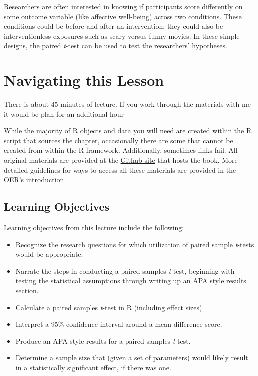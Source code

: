\documentclass[
  11pt,
]{book}
\providecommand{\tightlist}{%
  \setlength{\itemsep}{0pt}\setlength{\parskip}{0pt}}
\begin{document}
Researchers are often interested in knowing if participants score differently on some outcome variable (like affective well-being) across two conditions. These conditions could be before and after an intervention; they could also be interventionless exposures such as scary versus funny movies. In these simple designs, the paired \emph{t}-test can be used to test the researchers' hypotheses.

\hypertarget{navigating-this-lesson-4}{%
\section{Navigating this Lesson}\label{navigating-this-lesson-4}}

There is about 45 minutes of lecture. If you work through the materials with me it would be plan for an additional hour

While the majority of R objects and data you will need are created within the R script that sources the chapter, occasionally there are some that cannot be created from within the R framework. Additionally, sometimes links fail. All original materials are provided at the \href{https://github.com/lhbikos/ReCenterPsychStats}{Github site} that hosts the book. More detailed guidelines for ways to access all these materials are provided in the OER's \protect\hyperlink{ReCintro}{introduction}

\hypertarget{learning-objectives-4}{%
\subsection{Learning Objectives}\label{learning-objectives-4}}

Learning objectives from this lecture include the following:

\begin{itemize}
\tightlist
\item
  Recognize the research questions for which utilization of paired sample \emph{t}-tests would be appropriate.
\item
  Narrate the steps in conducting a paired samples \emph{t}-test, beginning with testing the statistical assumptions through writing up an APA style results section.
\item
  Calculate a paired samples \emph{t}-test in R (including effect sizes).
\item
  Interpret a 95\% confidence interval around a mean difference score.
\item
  Produce an APA style results for a paired-samples \emph{t}-test.
\item
  Determine a sample size that (given a set of parameters) would likely result in a statistically significant effect, if there was one.
\end{itemize}
\end{document}
